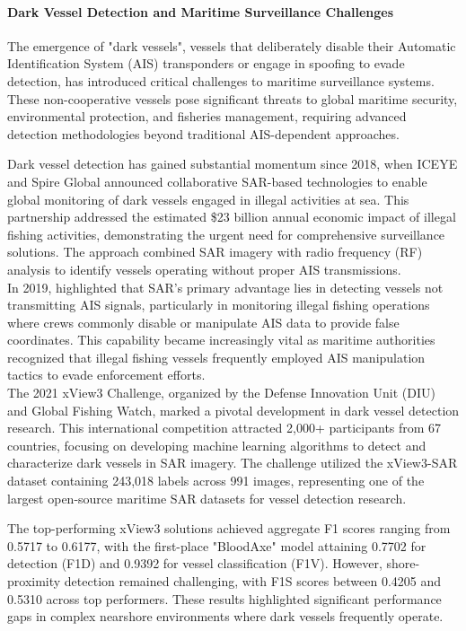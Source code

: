 \documentclass{article}
\begin{document}
	\paragraph{Dark Vessel Detection and Maritime Surveillance Challenges}
	The emergence of "dark vessels", vessels that deliberately disable their Automatic Identification System (AIS) transponders or engage in spoofing to evade detection, has introduced critical challenges to maritime surveillance systems. These non-cooperative vessels pose significant threats to global maritime security, environmental protection, and fisheries management, requiring advanced detection methodologies beyond traditional AIS-dependent approaches. 
	
	Dark vessel detection has gained substantial momentum since 2018, when \cite{ICEYE_MaritimeDomainAwareness} ICEYE and Spire Global announced collaborative SAR-based technologies to enable global monitoring of dark vessels engaged in illegal activities at sea. This partnership addressed the estimated \$23 billion annual economic impact of illegal fishing activities, demonstrating the urgent need for comprehensive surveillance solutions. The approach combined SAR imagery with radio frequency (RF) analysis to identify vessels operating without proper AIS transmissions. \\
	
	In 2019,\cite{MongabayNews} highlighted that SAR's primary advantage lies in detecting vessels not transmitting AIS signals, particularly in monitoring illegal fishing operations where crews commonly disable or manipulate AIS data to provide false coordinates. This capability became increasingly vital as maritime authorities recognized that illegal fishing vessels frequently employed AIS manipulation tactics to evade enforcement efforts. \\
	
	The 2021 xView3 Challenge, organized by the Defense Innovation Unit (DIU) and Global Fishing Watch, marked a pivotal development in dark vessel detection research. This international competition attracted 2,000+ participants from 67 countries, focusing on developing machine learning algorithms to detect and characterize dark vessels in SAR imagery. The challenge utilized the xView3-SAR dataset containing 243,018 labels across 991 images, representing one of the largest open-source maritime SAR datasets for vessel detection research.
	
	The top-performing xView3 solutions achieved aggregate F1 scores ranging from 0.5717 to 0.6177, with the first-place "BloodAxe" model attaining 0.7702 for detection (F1D) and 0.9392 for vessel classification (F1V). However, shore-proximity detection remained challenging, with F1S scores between 0.4205 and 0.5310 across top performers. These results highlighted significant performance gaps in complex nearshore environments where dark vessels frequently operate. \\
	
\end{document}
